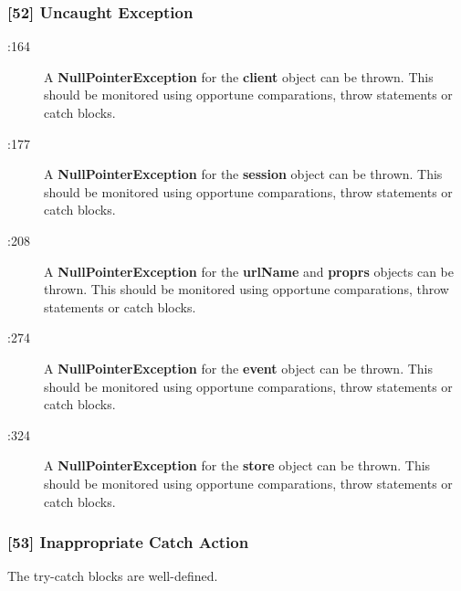 \subsubsection{[52] Uncaught Exception}
\begin{description}
	\item[:164] A \textbf{NullPointerException} for the \textbf{client} object can be thrown. This should be monitored using opportune comparations, throw statements or catch blocks.
	\item[:177] A \textbf{NullPointerException} for the \textbf{session} object can be thrown. This should be monitored using opportune comparations, throw statements or catch blocks.
	\item[:208] A \textbf{NullPointerException} for the \textbf{urlName} and \textbf{proprs} objects can be thrown. This should be monitored using opportune comparations, throw statements or catch blocks.
	\item[:274] A \textbf{NullPointerException} for the \textbf{event} object can be thrown. This should be monitored using opportune comparations, throw statements or catch blocks.
	\item[:324] A \textbf{NullPointerException} for the \textbf{store} object can be thrown. This should be monitored using opportune comparations, throw statements or catch blocks.
\end{description}

\subsubsection{[53] Inappropriate Catch Action}
The try-catch blocks are well-defined.
